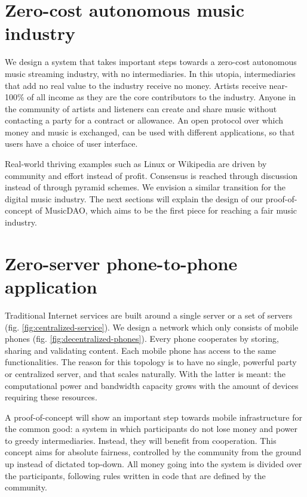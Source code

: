 \section{Zero-cost autonomous music industry}
We design a system that takes important steps towards a zero-cost autonomous music streaming industry, with no intermediaries. In this utopia, intermediaries that add no real value to the industry receive no money. Artists receive near-100\% of all income as they are the core contributors to the industry. Anyone in the community of artists and listeners can create and share music without contacting a party for a contract or allowance. An open protocol over which money and music is exchanged, can be used with different applications, so that users have a choice of user interface. 

Real-world thriving examples such as Linux or Wikipedia are driven by community and effort instead of profit. Consensus is reached through discussion instead of through pyramid schemes. We envision a similar transition for the digital music industry. The next sections will explain the design of our proof-of-concept of MusicDAO, which aims to be the first piece for reaching a fair music industry.

\section{Zero-server phone-to-phone application}
Traditional Internet services are built around a single server or a set of servers (fig. \ref{fig:centralized-service}). We design a network which only consists of mobile phones (fig. \ref{fig:decentralized-phones}). Every phone cooperates by storing, sharing and validating content. Each mobile phone has access to the same functionalities. The reason for this topology is to have no single, powerful party or centralized server, and that scales naturally. With the latter is meant: the computational power and bandwidth capacity grows with the amount of devices requiring these resources.

A proof-of-concept will show an important step towards mobile infrastructure for the common good: a system in which participants do not lose money and power to greedy intermediaries. Instead, they will benefit from cooperation. This concept aims for absolute fairness, controlled by the community from the ground up instead of dictated top-down. All money going into the system is divided over the participants, following rules written in code that are defined by the community.

